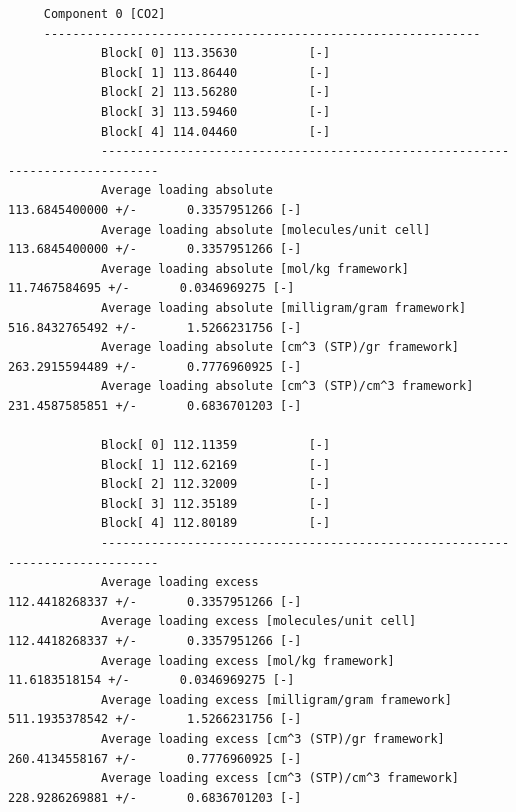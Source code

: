 \begin{tiny}
\begin{verbatim}
     Component 0 [CO2]
     -------------------------------------------------------------
             Block[ 0] 113.35630          [-]
             Block[ 1] 113.86440          [-]
             Block[ 2] 113.56280          [-]
             Block[ 3] 113.59460          [-]
             Block[ 4] 114.04460          [-]
             ------------------------------------------------------------------------------
             Average loading absolute                            113.6845400000 +/-       0.3357951266 [-]
             Average loading absolute [molecules/unit cell]      113.6845400000 +/-       0.3357951266 [-]
             Average loading absolute [mol/kg framework]                 11.7467584695 +/-       0.0346969275 [-]
             Average loading absolute [milligram/gram framework]        516.8432765492 +/-       1.5266231756 [-]
             Average loading absolute [cm^3 (STP)/gr framework]         263.2915594489 +/-       0.7776960925 [-]
             Average loading absolute [cm^3 (STP)/cm^3 framework]       231.4587585851 +/-       0.6836701203 [-]
     
             Block[ 0] 112.11359          [-]
             Block[ 1] 112.62169          [-]
             Block[ 2] 112.32009          [-]
             Block[ 3] 112.35189          [-]
             Block[ 4] 112.80189          [-]
             ------------------------------------------------------------------------------
             Average loading excess                            112.4418268337 +/-       0.3357951266 [-]
             Average loading excess [molecules/unit cell]      112.4418268337 +/-       0.3357951266 [-]
             Average loading excess [mol/kg framework]                   11.6183518154 +/-       0.0346969275 [-]
             Average loading excess [milligram/gram framework]          511.1935378542 +/-       1.5266231756 [-]
             Average loading excess [cm^3 (STP)/gr framework]           260.4134558167 +/-       0.7776960925 [-]
             Average loading excess [cm^3 (STP)/cm^3 framework]         228.9286269881 +/-       0.6836701203 [-]
\end{verbatim}
\end{tiny}

